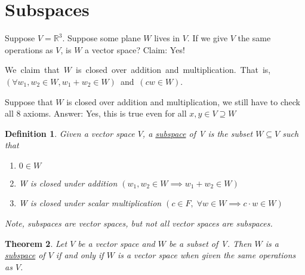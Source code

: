 \documentclass{article}
\newtheorem{theorem}{Theorem}[section]
\newtheorem{definition}[theorem]{Definition}
\newtheorem{one minute paper}[theorem]{One Minute Paper}
\begin{document}
\section*{Subspaces}

Suppose $V = \mathbb{R}^3$. Suppose some plane $W$ lives in $V$. If we give $V$ the same operations as $V$, is $W$ a vector space? Claim: Yes!

\hbox{We claim that $W$ is closed over addition and multiplication. That is, $(\forall w_1, w_2 \in W, w_1 + w_2 \in W)$ and $(cw \in W)$.}

Suppose that $W$ is closed over addition and multiplication, we still have to check all 8 axioms. Answer: Yes, this is true even for all $x,y \in V \supseteq W$

\begin{definition}
    Given a vector space $V$, a \underline{subspace} of V is the subset $W \subseteq V$ such that 
    \begin{enumerate}
        \item $0 \in W$
        \item W is closed under addition $(w_1, w_2 \in W \implies w_1 + w_2 \in W)$
        \item W is closed under scalar multiplication $(c \in F, \; \forall w \in W \implies c \cdot w \in W)$
    \end{enumerate}
    Note, subspaces are vector spaces, but not all vector spaces are subspaces. 
\end{definition}

\begin{theorem}
    Let $V$ be a vector space and $W$ be a subset of V. Then $W$ is a \underline{subspace} of $V$ if and only if
    $W$ is a vector space when given the same operations as $V$. 
\end{theorem}
\end{document}
